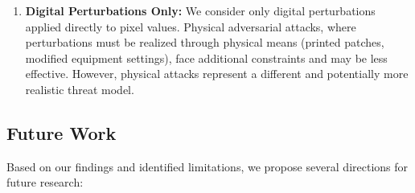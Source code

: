 \documentclass[12pt,a4paper]{article}
\begin{document}
\begin{enumerate}[leftmargin=*]
    \item \textbf{Digital Perturbations Only:} We consider only digital perturbations applied directly to pixel values. Physical adversarial attacks, where perturbations must be realized through physical means (printed patches, modified equipment settings), face additional constraints and may be less effective. However, physical attacks represent a different and potentially more realistic threat model.
\end{enumerate}

\subsection{Future Work}

Based on our findings and identified limitations, we propose several directions for future research:
\end{document}
